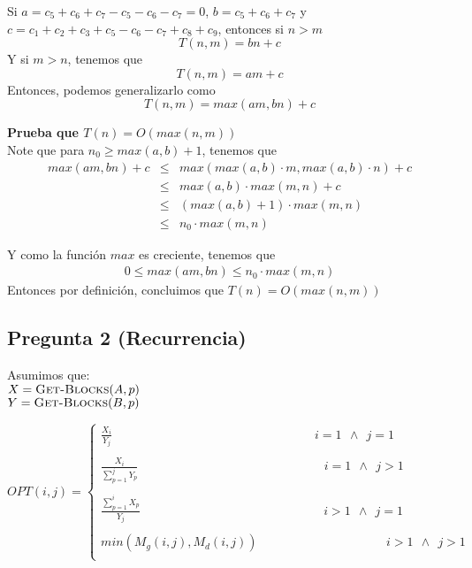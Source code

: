 \documentclass[12pt]{article}
\begin{document}
\noindent Si $a=c_5+c_6+c_7-c_5-c_6-c_7=0$, $b=c_5+c_6+c_7$ y $c=c_1+c_2+c_3+c_5-c_6-c_7+c_8+c_9$, entonces si $n>m$
$$T(n,m)=bn+c$$
Y si $m>n$, tenemos que
$$T(n,m)=am+c$$
Entonces, podemos generalizarlo como
$$T(n,m)=max(am,bn)+c$$


\noindent \textbf{Prueba que $T(n) = O(max(n,m))$} \\

\noindent Note que para $n_0\geq max(a,b)+1$, tenemos que 
\begin{eqnarray*}
max(am,bn)+c &\leq& max(max(a,b)\cdot m, max(a,b)\cdot n)+c \\
&\leq& max(a,b)\cdot max(m,n)+c \\
&\leq& (max(a,b)+1)\cdot max(m,n) \\
&\leq& n_0\cdot max(m,n)
\end{eqnarray*}

\noindent Y como la función $max$ es creciente, tenemos que
\begin{eqnarray*}
0\leq max(am,bn)\leq n_0\cdot max(m,n)
\end{eqnarray*}
\noindent Entonces por definición, concluimos que $T(n) = O(max(n,m))$

\subsection*{Pregunta 2 (Recurrencia)}

\noindent Asumimos que:\\
$X = \textsc{Get-Blocks}(A,p)$ \\
$Y = \textsc{Get-Blocks}(B,p)$ 

\[
OPT(i,j)=\left\{
            \begin{array}{ll}
              \frac{X_i}{Y_j} \ \ \ \ \ \ \ \ \ \ \ \ \ \ \ \ \ \ \ \ \ \ \ \ \ \ \ \ \ \ \ \ \ \ \ \ \ \ \ \ \ \ \ \ \ \ \ \ \ \ \ \ \ \ \ \ \ \ \ \ \ \ \ \ \ \ \ \ \ \ \ \ \ \ i=1 \ \ \wedge \ \ j=1 \\ \\
              \frac{X_i}{\sum_{p=1}^{j}Y_p} \ \ \ \ \ \ \ \ \ \ \ \ \ \ \ \ \ \ \ \ \ \ \ \ \ \ \ \ \ \ \ \ \ \ \ \ \ \ \ \ \ \ \ \ \ \ \ \ \ \ \ \ \ \ \ \ \ \ \ \ \ \ \ \ \ \ \ \ i=1 \ \ \wedge \ \ j>1 \\ \\
              \frac{\sum_{p=1}^{i}X_p}{Y_j} \ \ \ \ \ \ \ \ \ \ \ \ \ \ \ \ \ \ \ \ \ \ \ \ \ \ \ \ \ \ \ \ \ \ \ \ \ \ \ \ \ \ \ \ \ \ \ \ \ \ \ \ \ \ \ \ \ \ \ \ \ \ \ \ \ \ \ i>1 \ \ \wedge \ \ j=1 \\ \\
              min(M_g(i,j), M_d(i,j)) \ \ \ \ \ \ \ \ \ \ \ \ \ \  \ \ \ \ \ \ \ \ \ \ \ \ \ \ \ \ \ \ \ \ \ \ \ \ \ \ \ \ \ \ \ \ \ i>1 \ \ \wedge \ \ j>1 \\
            \end{array}
          \right.
\]
\end{document}
